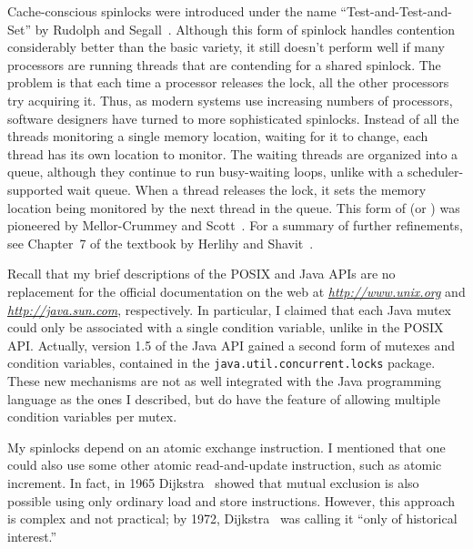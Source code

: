 Cache-conscious spinlocks were introduced under the name ``Test-and-Test-and-Set'' by Rudolph and Segall~\cite{max1200}.  Although this form of spinlock handles contention considerably better than the basic variety, it still doesn't perform well if many processors are running threads that are contending for a shared spinlock.  The problem is that each time a processor releases the lock, all the other processors try acquiring it. Thus, as modern systems use increasing numbers of processors, software designers have turned to more sophisticated spinlocks.  Instead of all the threads monitoring a single memory location, waiting for it to change, each thread has its own location to monitor.  The waiting threads are organized into a queue, although they continue to run busy-waiting loops, unlike with a scheduler-supported wait queue.  When a thread releases the lock, it sets the memory location being monitored by the next thread in the queue.  This form of  (or ) was pioneered by Mellor-Crummey and Scott~\cite{max1201}. For a summary of further refinements, see Chapter~7 of the textbook by Herlihy and Shavit~\cite{max1202}.

Recall that my brief descriptions of the POSIX and Java APIs are no
replacement for the official documentation on the web at
\textit{\url{http://www.unix.org}} and \textit{\url{http://java.sun.com}}, respectively.  In particular, I claimed that each Java mutex could only be associated with a single condition variable, unlike in the POSIX API. Actually, version 1.5 of the Java API gained a second form of mutexes and condition variables, contained in the \verb|java.util.|\linebreak[0]\verb|concurrent.locks| package. These new mechanisms are not as well integrated with the Java programming language as the ones I described, but do have the feature of allowing multiple condition variables per mutex.

My spinlocks depend on an atomic exchange instruction.  I mentioned
that one could also use some other atomic read-and-update instruction,
such as atomic increment.  In fact, in 1965 Dijkstra~\cite{max1000}
showed that mutual exclusion is also possible using only ordinary load
and store instructions.  However, this approach is complex and not
practical; by 1972, Dijkstra~\cite{max993} was calling it ``only of
historical interest.''


